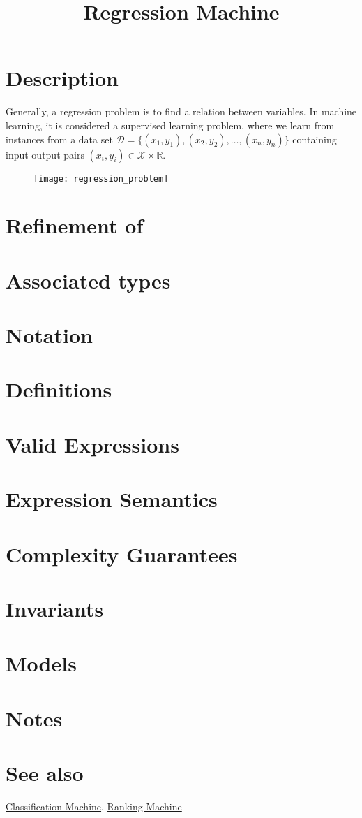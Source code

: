 \documentclass{article}
\begin{document}
\title{Regression Machine}
\maketitle

\section*{Description}

Generally, a regression problem is to find a relation between variables. 
In machine learning, it is considered a supervised learning problem, where we 
learn from instances from a data set 
$\mathcal{D}=\{ (x_1,y_1), (x_2,y_2), \ldots, (x_n, y_n ) \}$ 
containing input-output pairs $(x_i,y_i)\in \mathcal{X}\times \mathbb{R}$. 

\begin{figure}
\texttt{[image: regression\_problem]}
\end{figure}


\section*{Refinement of}
\section*{Associated types}
\section*{Notation}
\section*{Definitions}
\section*{Valid Expressions}
\section*{Expression Semantics}
\section*{Complexity Guarantees}
\section*{Invariants}
\section*{Models}
\section*{Notes}
\section*{See also}

\href{\kmlroot/classification.html}{Classification Machine},
\href{\kmlroot/ranking.html}{Ranking Machine}



\end{document}
